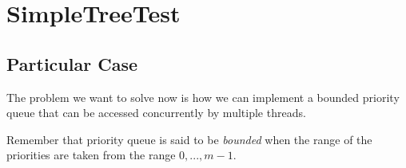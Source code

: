 \section{\textbf{SimpleTreeTest}}
\subsection{Particular Case}
\par
The problem we want to solve now is how we can implement a bounded priority
queue that can be accessed concurrently by multiple threads.
\par
Remember that priority queue is said to be \textit{bounded} when the range of
the priorities are taken from the range $0,...,m-1$.
\par
